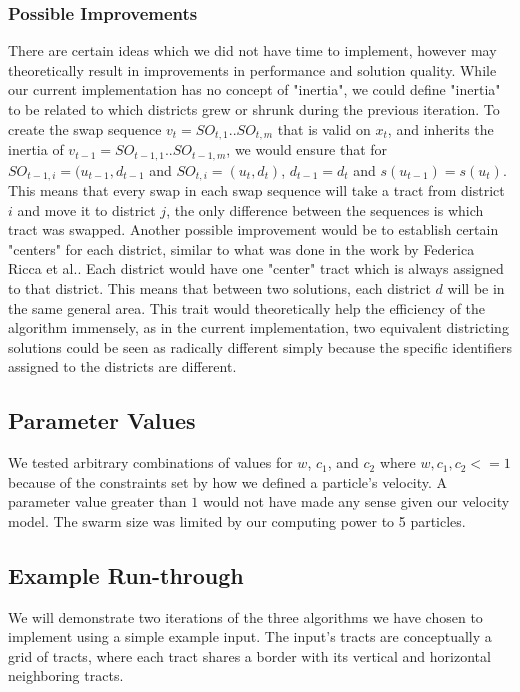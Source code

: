\documentclass[journal]{IEEEtran}
\begin{document}
\subsubsection{Possible Improvements}
There are certain ideas which we did not have time to implement, however may
theoretically result in improvements in performance and solution quality.  While
our current implementation has no concept of "inertia", we could define
"inertia" to be related to which districts grew or shrunk during the previous
iteration.  To create the swap sequence $v_{t} = SO_{t, 1} .. SO_{t, m}$ that is
valid on $x_t$, and inherits the inertia of $v_{t - 1} = SO_{t - 1, 1} .. SO_{t
- 1, m}$, we would ensure that for $SO_{t - 1, i} = (u_{t - 1}, d_{t - 1}$ and
$SO_{t, i} = (u_t, d_t)$, $d_{t - 1} = d_t$ and $s(u_{t - 1}) = s(u_t)$.  This
means that every swap in each swap sequence will take a tract from district $i$
and move it to district $j$, the only difference between the sequences is which
tract was swapped.  Another possible improvement would be to establish certain
"centers" for each district, similar to what was done in the work by Federica
Ricca et al.\cite{voronoi}.  Each district would have one "center" tract which
is always assigned to that district.  This means that between two solutions,
each district $d$ will be in the same general area.  This trait would
theoretically help the efficiency of the algorithm immensely, as in the current
implementation, two equivalent districting solutions could be seen as radically
different simply because the specific identifiers assigned to the districts are
different.


\subsection{Parameter Values}
We tested arbitrary combinations of values for $w$, $c_1$, and $c_2$ where $w, c_1, c_2 <= 1$ because of the constraints set by how we defined a particle's velocity. A parameter value greater than $1$ would not have made any sense given our velocity model. The swarm size was limited by our computing power to 5 particles.

\subsection{Example Run-through}
We will demonstrate two iterations of the three algorithms we have chosen to implement using a simple example input.
The input's tracts are conceptually a grid of tracts, where each tract shares a border with its vertical and horizontal neighboring tracts.
\end{document}
